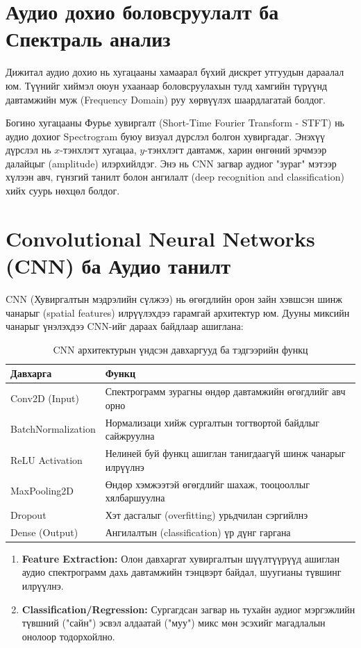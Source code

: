 \section{Аудио дохио боловсруулалт ба Спектраль анализ}

Дижитал аудио дохио нь хугацааны хамаарал бүхий дискрет утгуудын дараалал юм. Түүнийг хиймэл оюун ухаанаар боловсруулахын тулд хамгийн түрүүнд давтамжийн муж (Frequency Domain) руу хөрвүүлэх шаардлагатай болдог.

Богино хугацааны Фурье хувиргалт (Short-Time Fourier Transform - STFT) нь аудио дохиог Spectrogram буюу визуал дүрслэл болгон хувиргадаг. Энэхүү дүрслэл нь $x$-тэнхлэгт хугацаа, $y$-тэнхлэгт давтамж, харин өнгөний эрчмээр далайцыг (amplitude) илэрхийлдэг. Энэ нь CNN загвар аудиог "зураг" мэтээр хүлээн авч, гүнзгий танилт болон ангилалт (deep recognition and classification) хийх суурь нөхцөл болдог.

\section{Convolutional Neural Networks (CNN) ба Аудио танилт}

CNN (Хувиргалтын мэдрэлийн сүлжээ) нь өгөгдлийн орон зайн хэвшсэн шинж чанарыг (spatial features) илрүүлэхдээ гарамгай архитектур юм. Дууны миксийн чанарыг үнэлэхдээ CNN-ийг дараах байдлаар ашиглана:

\begin{table}[htbp]
\centering
\caption{CNN архитектурын үндсэн давхаргууд ба тэдгээрийн функц}
\label{tab:CNNArchitecture}
\begin{tabular}{|l|p{10cm}|}
\hline
\textbf{Давхарга} & \textbf{Функц} \\
\hline
Conv2D (Input) & Спектрограмм зурагны өндөр давтамжийн өгөгдлийг авч орно \\
\hline
BatchNormalization & Нормализаци хийж сургалтын тогтвортой байдлыг сайжруулна \\
\hline
ReLU Activation & Нелиней буй функц ашиглан танигдаагүй шинж чанарыг илрүүлнэ \\
\hline
MaxPooling2D & Өндөр хэмжээтэй өгөгдлийг шахаж, тооцооллыг хялбаршуулна \\
\hline
Dropout & Хэт дасгалыг (overfitting) урьдчилан сэргийлнэ \\
\hline
Dense (Output) & Ангилалтын (classification) үр дүнг гаргана \\
\hline
\end{tabular}
\end{table}
\begin{enumerate}
    \item \textbf{Feature Extraction:} Олон давхаргат хувиргалтын шүүлтүүрүүд ашиглан аудио спектрограмм дахь давтамжийн тэнцвэрт байдал, шуугианы түвшинг илрүүлнэ.
    \item \textbf{Classification/Regression:} Сургагдсан загвар нь тухайн аудиог мэргэжлийн түвшний ("сайн") эсвэл алдаатай ("муу") микс мөн эсэхийг магадлалын онолоор тодорхойлно.
\end{enumerate}



